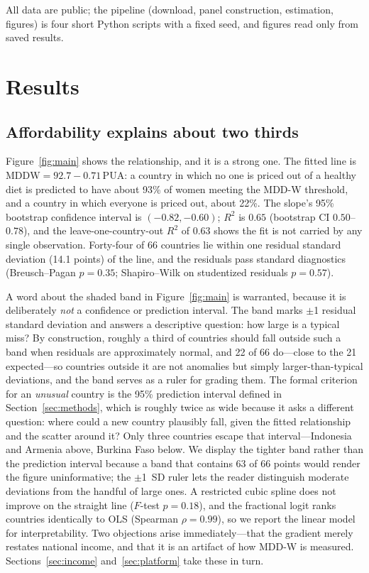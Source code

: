 \documentclass[11pt]{article}
\begin{document}
All data are public; the pipeline (download, panel construction, estimation, figures) is four short Python scripts with a fixed seed, and figures read only from saved results.

\section{Results}\label{sec:results}

\subsection{Affordability explains about two thirds}\label{sec:headline}

Figure~\ref{fig:main} shows the relationship, and it is a strong one. The fitted line is $\mathrm{MDDW} = 92.7 - 0.71\,\mathrm{PUA}$: a country in which no one is priced out of a healthy diet is predicted to have about 93\% of women meeting the MDD-W threshold, and a country in which everyone is priced out, about 22\%. The slope's 95\% bootstrap confidence interval is $(-0.82, -0.60)$; $R^2$ is $0.65$ (bootstrap CI $0.50$--$0.78$), and the leave-one-country-out $R^2$ of $0.63$ shows the fit is not carried by any single observation. Forty-four of 66 countries lie within one residual standard deviation (14.1 points) of the line, and the residuals pass standard diagnostics (Breusch--Pagan $p=0.35$; Shapiro--Wilk on studentized residuals $p=0.57$).

A word about the shaded band in Figure~\ref{fig:main} is warranted, because it is deliberately \emph{not} a confidence or prediction interval. The band marks $\pm$1 residual standard deviation and answers a descriptive question: how large is a typical miss? By construction, roughly a third of countries should fall outside such a band when residuals are approximately normal, and 22 of 66 do---close to the 21 expected---so countries outside it are not anomalies but simply larger-than-typical deviations, and the band serves as a ruler for grading them. The formal criterion for an \emph{unusual} country is the 95\% prediction interval defined in Section~\ref{sec:methods}, which is roughly twice as wide because it asks a different question: where could a new country plausibly fall, given the fitted relationship and the scatter around it? Only three countries escape that interval---Indonesia and Armenia above, Burkina Faso below. We display the tighter band rather than the prediction interval because a band that contains 63 of 66 points would render the figure uninformative; the $\pm$1~SD ruler lets the reader distinguish moderate deviations from the handful of large ones. A restricted cubic spline does not improve on the straight line ($F$-test $p=0.18$), and the fractional logit ranks countries identically to OLS (Spearman $\rho=0.99$), so we report the linear model for interpretability. Two objections arise immediately---that the gradient merely restates national income, and that it is an artifact of how MDD-W is measured. Sections~\ref{sec:income} and~\ref{sec:platform} take these in turn.
\end{document}

